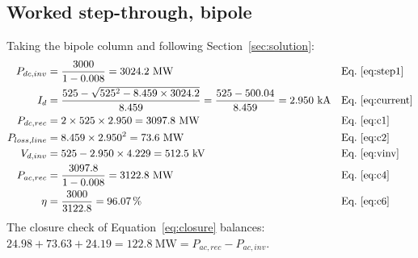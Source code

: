 \subsection{Worked step-through, bipole}
Taking the bipole column and following Section~\ref{sec:solution}:
\begin{align*}
  P_{dc,inv} &= \frac{3000}{1-0.008} = 3024.2\ \mathrm{MW}
              && \text{Eq.~\eqref{eq:step1}} \\
  I_{d}      &= \frac{525 - \sqrt{525^{2} - 8.459\times 3024.2}}{8.459}
              = \frac{525 - 500.04}{8.459} = 2.950\ \mathrm{kA}
              && \text{Eq.~\eqref{eq:current}} \\
  P_{dc,rec} &= 2\times 525 \times 2.950 = 3097.8\ \mathrm{MW}
              && \text{Eq.~\eqref{eq:c1}} \\
  P_{loss,line} &= 8.459 \times 2.950^{2} = 73.6\ \mathrm{MW}
              && \text{Eq.~\eqref{eq:c2}} \\
  V_{d,inv}  &= 525 - 2.950\times 4.229 = 512.5\ \mathrm{kV}
              && \text{Eq.~\eqref{eq:vinv}} \\
  P_{ac,rec} &= \frac{3097.8}{1-0.008} = 3122.8\ \mathrm{MW}
              && \text{Eq.~\eqref{eq:c4}} \\
  \eta       &= \frac{3000}{3122.8} = 96.07\,\%
              && \text{Eq.~\eqref{eq:c6}}
\end{align*}
The closure check of Equation~\eqref{eq:closure} balances:
$24.98 + 73.63 + 24.19 = 122.8\ \mathrm{MW} = P_{ac,rec}-P_{ac,inv}$.

